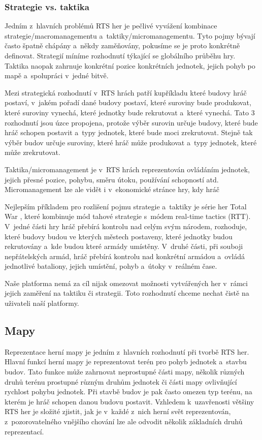 \subsubsection*{Strategie vs. taktika}
Jedním z~hlavních problémů RTS her je pečlivé vyvážení kombinace strategie/macromanagementu a~taktiky/micromanagementu. Tyto pojmy bývají často špatně chápány a~někdy zaměňovány, pokusíme se je proto konkrétně definovat. Strategií míníme rozhodnutí týkající se globálního průběhu hry. Taktika naopak zahrnuje konkrétní pozice konkrétních jednotek, jejich pohyb po mapě a~spolupráci v~jedné bitvě. 

Mezi strategická rozhodnutí v~RTS hrách patří kupříkladu které budovy hráč postaví, v~jakém pořadí dané budovy postaví, které suroviny bude produkovat, které suroviny vynechá, které jednotky bude rekrutovat a~které vynechá. Tato 3 rozhodnutí jsou úzce propojena, protože výběr surovin určuje budovy, které bude hráč schopen postavit a~typy jednotek, které bude moci zrekrutovat. Stejně tak výběr budov určuje suroviny, které hráč může produkovat a~typy jednotek, které může zrekrutovat. 

Taktika/micromanagement je v~RTS hrách reprezentován ovládáním jednotek, jejich přesné pozice, pohybu, směru útoku, používání schopností atd. Micromanagement lze ale vidět i v~ekonomické stránce hry, kdy hráč 

Nejlepším příkladem pro rozlišení pojmu strategie a~taktiky je série her Total War \citep{site:totalwar}, které kombinuje mód tahové strategie s~módem real-time tactics (RTT). V~jedné části hry hráč přebírá kontrolu nad celým svým národem, rozhoduje, které budovy budou ve kterých městech postaveny, které jednotky budou rekrutovány a~kde budou které armády umístěny. V~druhé části, při souboji nepřátelských armád, hráč přebírá kontrolu nad konkrétní armádou a~ovládá jednotlivé bataliony, jejich umístění, pohyb a~útoky v~reálném čase.

Naše platforma nemá za cíl nijak omezovat možnosti vytvářených her v~rámci jejich zaměření na taktiku či strategii. Toto rozhodnutí chceme nechat čistě na uživateli naší platformy.

\subsection{Mapy}
\label{sec:mapy}
Reprezentace herní mapy je jedním z~hlavních rozhodnutí při tvorbě RTS her. Hlavní funkcí herní mapy je reprezentovat terén pro pohyb jednotek a~stavbu budov. 
Tato funkce může zahrnovat neprostupné části mapy, několik různých druhů terénu prostupné různým druhům jednotek či části mapy ovlivňující rychlost pohybu jednotek.
Při stavbě budov je pak často omezen typ terénu, na kterém je hráč schopen danou budovu postavit. 
Vzhledem k~uzavřenosti většiny RTS her je složité zjistit, jak je v~každé z~nich herní svět reprezentován, z~pozorovatelného vnějšího chování lze ale odvodit několik základních druhů reprezentací. 

